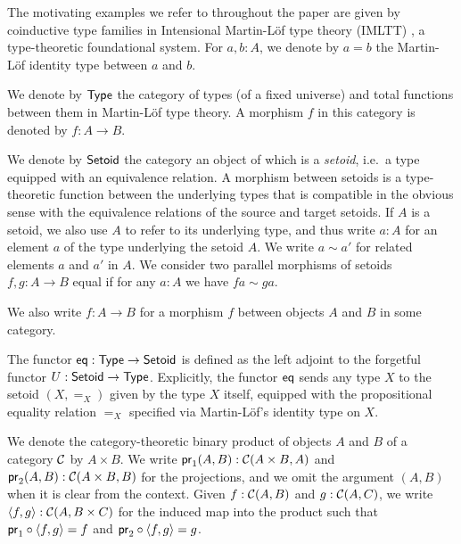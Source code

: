\documentclass{amsart}
\begin{document}
The motivating examples we refer to throughout the paper are given by coinductive type families in Intensional Martin-L\"of type theory (IMLTT) \parencite{martin_lof}, 
a type-theoretic foundational system.
For $a,b : A$, we denote by $a = b$ the Martin-L\"of identity type between $a$ and $b$.



% 

\begin{definition}\label{def:set_setoid}
 We denote by $\Set$ the category of types (of a fixed universe) and total functions between them in Martin-L\"of type theory. 
 A morphism $f$ in this category is denoted by $f : A \to B$.
 
 We denote by $\Setoid$ the category an object of which is a \emph{setoid}, i.e.\ a type equipped with an equivalence relation.
 A morphism between setoids is a type-theoretic function between the underlying types that is compatible in the obvious sense with the equivalence relations of the source and target setoids.
 If $A$ is a setoid, we also use $A$ to refer to its underlying type, and thus write $a:A$ for an element $a$ of the type underlying the setoid $A$. 
 We write $a\sim a'$ for related elements $a$ and $a'$ in $A$.
 We consider two parallel morphisms of setoids $f,g:A\to B$ equal if for any $a:A$ we have $fa \sim ga$.
\end{definition}

We also write $f:A\to B$ for a morphism $f$ between objects $A$ and $B$ in some category.


\begin{definition}\label{def:eq}
 The functor $\eq : \Set\to\Setoid$ is defined as the left adjoint to the forgetful functor $U : \Setoid \to \Set$.
  Explicitly, the functor $\eq$ sends any type $X$ to the setoid $(X,=_X)$ given by the type $X$ itself, equipped
  with the propositional equality relation $=_X$ specified via Martin-L\"of's identity type on $X$.
\end{definition}


\begin{remark}
  We denote the category-theoretic binary product of objects $A$ and $B$ of a category $\C$ by $A\times B$.
  We write $\pr_1(A,B) : \C(A\times B, A)$ and $\pr_2(A,B) :\C(A\times B, B)$ for the projections, and we omit the 
  argument $(A,B)$ when it is clear from the context.
  Given $f : \C(A, B)$ and $g : \C(A,C)$, we write $\langle f,g\rangle : \C(A,B\times C)$ for the induced map into the product such that
  $\comp{\langle f,g\rangle}{\pr_1} = f$ and $\comp{\langle f,g\rangle}{\pr_2} = g$.
\end{remark}
\end{document}
